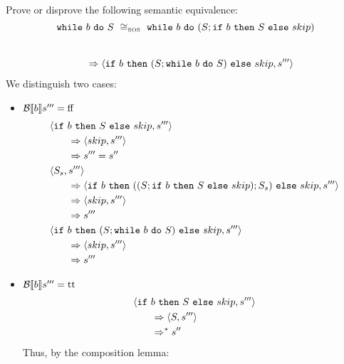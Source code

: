 \begin{exercise}{
    Prove or disprove the following semantic equivalence:
    \[ \wwhile{b}{S}\ \cong_{\text{\tiny SOS}}\ \wwhile{b}{(S;\wif{b}{S}{skip})} \]
}
\begin{itemize}
\begin{itemize}
\begin{itemize}
\begin{align*}
                                \\&\qquad\Rightarrow \left<\texttt{if}\ b\ \texttt{then}\ (S; \texttt{while}\ b\ \texttt{do}\ S)\ \texttt{else}\ skip, s'''\right>
                            \end{align*}
                            We distinguish two cases:
                            \begin{itemize}
                                \item $\mathcal{B} \llbracket b \rrbracket s''' = \text{ff}$
                                    \begin{align*}
                                        &\left<\texttt{if}\ b\ \texttt{then}\ S\ \texttt{else}\ skip, s'''\right>
                                        \\&\qquad\Rightarrow \left<skip, s'''\right>
                                        \\&\qquad\Rightarrow s''' = s''
                                        \\
                                        &\left<S_s, s'''\right>
                                        \\&\qquad\Rightarrow \left<\texttt{if}\ b\ \texttt{then}\ ((S;\texttt{if}\ b\ \texttt{then}\ S\ \texttt{else}\ skip);S_s)\ \texttt{else}\ skip, s'''\right>
                                        \\&\qquad\Rightarrow \left<skip, s'''\right>
                                        \\&\qquad\Rightarrow s'''
                                        \\
                                        &\left<\texttt{if}\ b\ \texttt{then}\ (S; \texttt{while}\ b\ \texttt{do}\ S)\ \texttt{else}\ skip, s'''\right>
                                        \\&\qquad\Rightarrow \left<skip, s'''\right>
                                        \\&\qquad\Rightarrow s'''
                                    \end{align*}
                                \item $\mathcal{B} \llbracket b \rrbracket s''' = \text{tt}$
                                    \begin{align*}
                                        &\left<\texttt{if}\ b\ \texttt{then}\ S\ \texttt{else}\ skip, s'''\right>
                                        \\&\qquad\Rightarrow \left<S, s'''\right>
                                        \\&\qquad\Rightarrow^* s''
                                    \end{align*}
                                    Thus, by the composition lemma:
                                    \begin{align*}

\end{align*}
\end{itemize}
\end{itemize}
\end{itemize}
\end{itemize}
\end{exercise}
